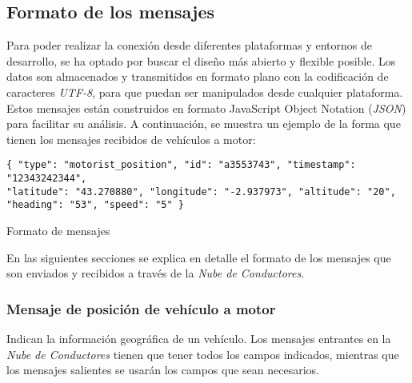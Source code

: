 
\subsection{Formato de los mensajes}\label{ssection:FormatoMensajesNC}
Para poder realizar la conexión desde diferentes plataformas y entornos de desarrollo, se ha optado por buscar el diseño más abierto y flexible posible. Los datos son almacenados y transmitidos en formato plano con la codificación de caracteres \emph{UTF-8}, para que puedan ser manipulados desde cualquier plataforma. Estos mensajes están construidos en formato JavaScript Object Notation (\emph{JSON}) para facilitar su análisis. A continuación, se muestra un ejemplo de la forma que tienen los mensajes recibidos de vehículos a motor:

\begin{listing}
	\begin{minipage}{.4\textwidth}
		\begin{verbatim}
{ "type": "motorist_position", "id": "a3553743", "timestamp": "12343242344", 
"latitude": "43.270880", "longitude": "-2.937973", "altitude": "20", 
"heading": "53", "speed": "5" }			
		\end{verbatim}
	\end{minipage}
	\caption{Formato de mensajes}\label{alg:formatoMensajes}
\end{listing}

En las siguientes secciones se explica en detalle el formato de los mensajes que son enviados y recibidos a través de la \emph{Nube de Conductores}.

\subsubsection{Mensaje de posición de vehículo a motor}\label{sssection:MensajePosVehMotor}
Indican la información geográfica de un vehículo. Los mensajes entrantes en la \emph{Nube de Conductores} tienen que tener todos los campos indicados, mientras que los mensajes salientes se usarán los campos que sean necesarios.

